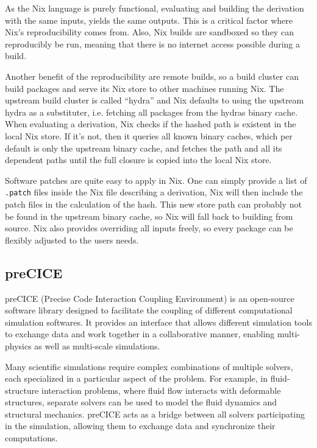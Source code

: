 \documentclass{eceasst}
\begin{document}
As the Nix language is purely functional, evaluating and building the derivation with the same inputs, yields the same outputs.
This is a critical factor where Nix's reproducibility comes from.
Also, Nix builds are sandboxed so they can reproducibly be run, meaning that there is no internet access possible during a build.

Another benefit of the reproducibility are remote builds, so a build cluster can build packages and serve its Nix store to other machines running Nix.
The upstream build cluster is called ``hydra'' and Nix defaults to using the upstream hydra as a substituter, i.e. fetching all packages from the hydras binary cache.
When evaluating a derivation, Nix checks if the hashed path is existent in the local Nix store.
If it's not, then it queries all known binary caches, which per default is only the upstream binary cache, and fetches the path and all its dependent paths until the full closure is copied into the local Nix store.

Software patches are quite easy to apply in Nix.
One can simply provide a list of \texttt{.patch} files inside the Nix file describing a derivation, Nix will then include the patch files in the calculation of the hash.
This new store path can probably not be found in the upstream binary cache, so Nix will fall back to building from source.
Nix also provides overriding all inputs freely, so every package can be flexibly adjusted to the users needs.


\subsection{preCICE}

preCICE (Precise Code Interaction Coupling Environment) is an open-source software library designed to facilitate the coupling of different computational simulation softwares.
It provides an interface that allows different simulation tools to exchange data and work together in a collaborative manner, enabling multi-physics as well as multi-scale simulations.

Many scientific simulations require complex combinations of multiple solvers, each specialized in a particular aspect of the problem.
For example, in fluid-structure interaction problems, where fluid flow interacts with deformable structures, separate solvers can be used to model the fluid dynamics and structural mechanics.
preCICE acts as a bridge between all solvers participating in the simulation, allowing them to exchange data and synchronize their computations.
\end{document}
